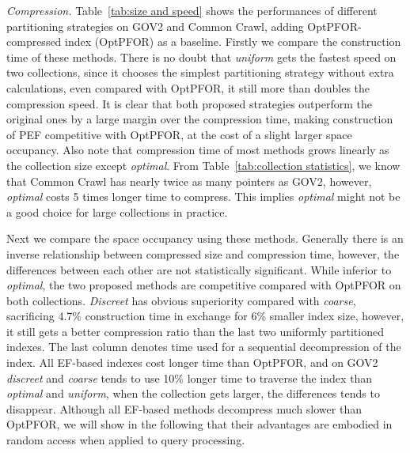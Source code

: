\documentclass[runningheads]{comsis2}
\begin{document}
\textit{Compression.} Table~\ref{tab:size and speed} shows the performances of different partitioning strategies on GOV2 and Common Crawl, adding OptPFOR-compressed index (OptPFOR) as a baseline.
Firstly we compare the construction time of these methods.
There is no doubt that \textit{uniform} gets the fastest speed on two collections, since it chooses the simplest partitioning strategy without extra calculations, even compared with OptPFOR, it still more than doubles the compression speed.
It is clear that both proposed strategies outperform the original ones by a large margin over the compression time, making construction of PEF competitive with OptPFOR, at the cost of a slight larger space occupancy.
Also note that compression time of most methods grows linearly as the collection size except \textit{optimal}.
From Table~\ref{tab:collection statistics}, we know that Common Crawl has nearly twice as many pointers as GOV2, however, \textit{optimal} costs 5 times longer time to compress.
This implies \textit{optimal} might not be a good choice for large collections in practice.

Next we compare the space occupancy using these methods.
Generally there is an inverse relationship between compressed size and compression time, however, the differences between each other are not statistically significant.
While inferior to \textit{optimal}, the two proposed methods are competitive compared with OptPFOR on both collections.
\textit{Discreet} has obvious superiority compared with \textit{coarse}, sacrificing 4.7\% construction time in exchange for 6\% smaller index size, however, it still gets a better compression ratio than the last two uniformly partitioned indexes.
The last column denotes time used for a sequential decompression of the index.
All EF-based indexes cost longer time than OptPFOR, and on GOV2 \textit{discreet} and \textit{coarse} tends to use 10\% longer time to traverse the index than \textit{optimal} and \textit{uniform}, when the collection gets larger, the differences tends to disappear.
Although all EF-based methods decompress much slower than OptPFOR, we will show in the following that their advantages are embodied in random access when applied to query processing.
\end{document}
